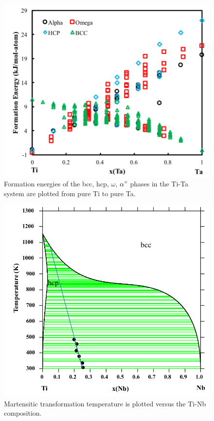 \pagebreak
\begin{figure}[H]
	\centering
	\includegraphics[width=\textwidth]{Chapter-7/Figures/tita0k.png}
	\caption{Formation energies of the bcc, hcp, $\omega$, $\alpha"$ phases in the Ti-Ta system are plotted from pure Ti to pure Ta.}
	\label{Ch7-figure:titab0K}
\end{figure}

\pagebreak
\begin{figure}[H]
	\centering
	\includegraphics[width=\textwidth]{Chapter-7/Figures/tinbms.png}
	\caption{Martensitic transformation temperature is plotted versus the Ti-Nb composition.}
	\label{Ch7-figure:titnbms}
\end{figure}

